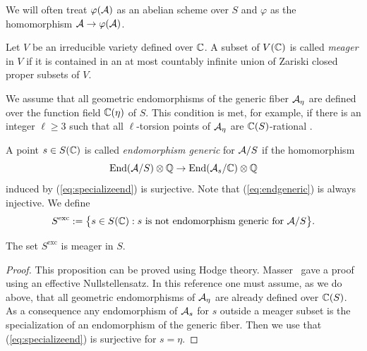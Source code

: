 \documentclass[12pt,oneside]{amsart}
\begin{document}
We will often treat $\varphi(\mathcal{A})$ as an abelian scheme over $S$ and
$\varphi$ as the homomorphism $\mathcal{A}\rightarrow \varphi(\mathcal{A})$.



Let $V$ be an irreducible variety defined over ${\mathbb{C}}$. A subset of
$V({\mathbb{C}})$ is called \textit{meager} in $V$ if it is contained in an at most
countably infinite union of Zariski closed proper subsets of $V$.



We assume that all geometric endomorphisms of the
generic fiber $\mathcal{A}_\eta$ are defined over the function field ${\mathbb{C}}(\eta)$ of $S$.
This condition is met, for example,  if there is an integer $\ell\ge 3$
such that all $\ell$-torsion points of $\mathcal{A}_{\eta}$ are
${\mathbb{C}}(S)$-rational \cite[Theorem~2.4]{Silverberg:fielddef}.


A point $s\in S({\mathbb{C}})$ is called \textit{endomorphism generic} for $\mathcal{A}/S$
if the homomorphism 
\begin{equation}
  \label{eq:endgeneric}
  \mathrm{End}(\mathcal{A}/S)\otimes{\mathbb{Q}} \rightarrow \mathrm{End}(\mathcal{A}_s/{\mathbb{C}})\otimes{\mathbb{Q}}
\end{equation}
induced by (\ref{eq:specializeend})
is surjective. Note that (\ref{eq:endgeneric}) is always injective.
We define
\begin{equation}
  \label{eq:exceptionalsubset}
  S^{\mathrm{exc}} := \bigl\{s \in S({\mathbb{C}}) : s\text{ is not endomorphism
  generic for $\mathcal{A}/S$}\bigr\}.
\end{equation}


\begin{proposition}
  \label{prop:excep}
  The set $S^{\mathrm{exc}}$ is meager in $S$. 
\end{proposition}
\begin{proof}
  This proposition can be proved using Hodge theory.
  Masser~\cite[Proposition]{Masser:Specialization} gave a 
  proof using an effective Nullstellensatz.
  In this reference one must assume, as we do above, 
  that all geometric endomorphisms of $\mathcal{A}_\eta$ are
  already defined over ${\mathbb{C}}(S)$. 
  As a consequence any endomorphism of $\mathcal{\mathcal{A}}_s$ for 
  $s$ outside a meager subset
  is the specialization of an endomorphism of the generic
  fiber. Then we use that (\ref{eq:specializeend}) is surjective for $s=\eta$. 
\end{proof}
\end{document}
